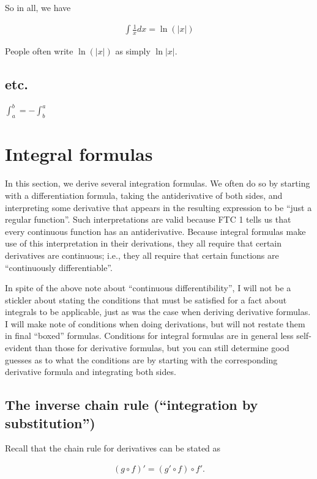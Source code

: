 So in all, we have 

\begin{align*}
    \boxed
    {
        \int \frac{1}{x} dx = \ln(|x|)
    }
\end{align*}

People often write $\ln(|x|)$ as simply $\ln|x|$.

\subsection*{etc.}

$\int_a^b = -\int_b^a$

\section*{Integral formulas}
    
In this section, we derive several integration formulas. We often do so by starting with a differentiation formula, taking the antiderivative of both sides, and interpreting some derivative that appears in the resulting expression to be ``just a regular function''. Such interpretations are valid because FTC 1 tells us that every continuous function has an antiderivative. Because integral formulas make use of this interpretation in their derivations, they all require that certain derivatives are continuous; i.e., they all require that certain functions are ``continuously differentiable''. 

In spite of the above note about ``continuous differentibility'', I will not be a stickler about stating the conditions that must be satisfied for a fact about integrals to be applicable, just as was the case when deriving derivative formulas. I will make note of conditions when doing derivations, but will not restate them in final ``boxed'' formulas. Conditions for integral formulas are in general less self-evident than those for derivative formulas, but you can still determine good guesses as to what the conditions are by starting with the corresponding derivative formula and integrating both sides.

\subsection*{The inverse chain rule (``integration by substitution'')}

Recall that the chain rule for derivatives can be stated as

\begin{align*}
    (g \circ f)' = (g' \circ f) \circ f'.
\end{align*}

